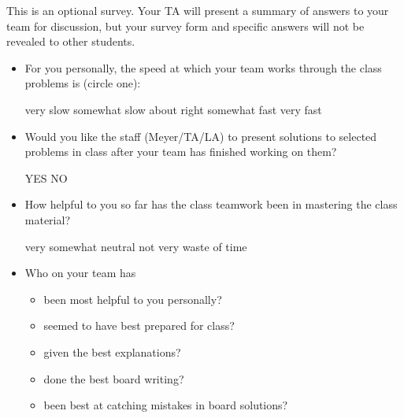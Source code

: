 \documentclass[handout]{mcs}
\begin{document}

This is an optional survey.  Your TA will present a summary of answers
to your team for discussion, but your survey form and specific answers
will not be revealed to other students.

\begin{itemize}

\item For you personally, the speed at which your team works through
  the class problems is (circle one):

very slow\hspace{0.4in} somewhat slow\hspace{0.4in} about
right\hspace{0.4in} somewhat fast\hspace{0.4in} very fast

\item Would you like the staff (Meyer/TA/LA) to present solutions to
  selected problems in class after your team has finished working on
  them?
\begin{center}
YES \hspace{1in} NO
\end{center}

\item How helpful to you so far has the class teamwork been in
  mastering the class material?

\begin{center}
very\hspace{0.5in} somewhat \hspace{0.5in} neutral\hspace{0.5in} not
very \hspace{0.5in} waste of time
\end{center}

\item Who on your team has
  \begin{itemize}
    \item been most helpful to you personally?\hfill\brule{2in}
    \item seemed to have best prepared for class?\hfill\brule{2in}
    \item given the best explanations?\hfill\brule{2in}
    \item done the best board writing?\hfill\brule{2in}
    \item been best at catching mistakes in board solutions?\hfill\brule{2in}
  \end{itemize}


\end{itemize}
\end{document}
